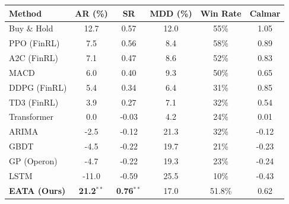 \begin{tabular}{lccccc}
\toprule
\textbf{Method} & \textbf{AR (\%)} & \textbf{SR} & \textbf{MDD (\%)} & \textbf{Win Rate} & \textbf{Calmar} \\
\midrule
Buy \& Hold & 12.7 & 0.57 & 12.0 & 55\% & 1.05 \\
PPO (FinRL) & 7.5 & 0.56 & 8.4 & 58\% & 0.89 \\
A2C (FinRL) & 7.1 & 0.47 & 8.6 & 52\% & 0.83 \\
MACD & 6.0 & 0.40 & 9.3 & 50\% & 0.65 \\
DDPG (FinRL) & 5.4 & 0.34 & 6.4 & 31\% & 0.85 \\
TD3 (FinRL) & 3.9 & 0.27 & 7.1 & 32\% & 0.54 \\
Transformer & 0.0 & -0.03 & 4.2 & 24\% & 0.01 \\
ARIMA & -2.5 & -0.12 & 21.3 & 32\% & -0.12 \\
GBDT & -4.5 & -0.22 & 19.7 & 21\% & -0.23 \\
GP (Operon) & -4.7 & -0.22 & 19.3 & 23\% & -0.24 \\
LSTM & -11.0 & -0.59 & 25.5 & 10\% & -0.43 \\
\midrule
\textbf{EATA (Ours)} & \textbf{21.2}$^{**}$ & \textbf{0.76}$^{**}$ & 17.0 & 51.8\% & 0.62 \\
\bottomrule
\end{tabular}
